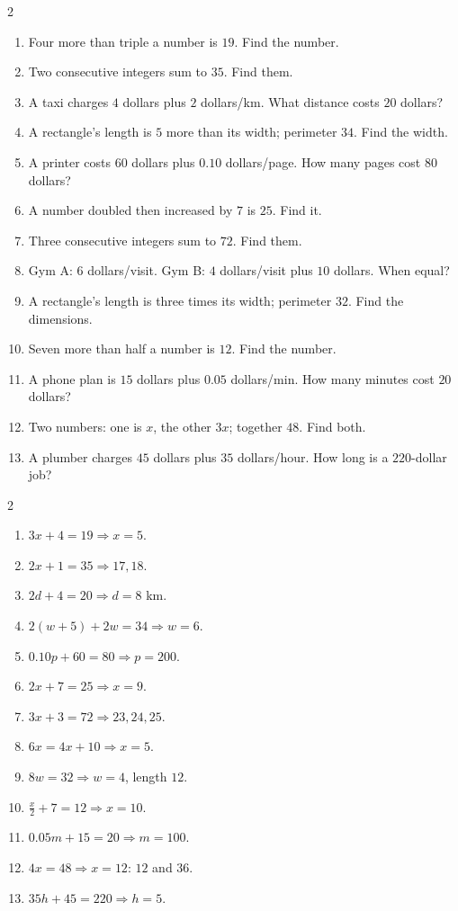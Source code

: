 \documentclass[11pt]{article}
\begin{document}
\begin{recapbox}
\begin{multicols}{2}
\small
\begin{enumerate}[leftmargin=*,itemsep=3pt]
  \item Four more than triple a number is $19$. Find the number.
  \item Two consecutive integers sum to $35$. Find them.
  \item A taxi charges $4$ dollars plus $2$ dollars/km. What distance costs $20$ dollars?
  \item A rectangle's length is $5$ more than its width; perimeter $34$. Find the width.
  \item A printer costs $60$ dollars plus $0.10$ dollars/page. How many pages cost $80$ dollars?
  \item A number doubled then increased by $7$ is $25$. Find it.
  \item Three consecutive integers sum to $72$. Find them.
  \item Gym A: $6$ dollars/visit. Gym B: $4$ dollars/visit plus $10$ dollars. When equal?
  \item A rectangle's length is three times its width; perimeter $32$. Find the dimensions.
  \item Seven more than half a number is $12$. Find the number.
  \item A phone plan is $15$ dollars plus $0.05$ dollars/min. How many minutes cost $20$ dollars?
  \item Two numbers: one is $x$, the other $3x$; together $48$. Find both.
  \item A plumber charges $45$ dollars plus $35$ dollars/hour. How long is a $220$-dollar job?
\end{enumerate}
\end{multicols}
\end{recapbox}

\begin{keybox}
\begin{multicols}{2}
\small
\begin{enumerate}[leftmargin=*,itemsep=3pt]
  \item $3x+4=19\Rightarrow x=5$.
  \item $2x+1=35\Rightarrow 17,18$.
  \item $2d+4=20\Rightarrow d=8$ km.
  \item $2(w+5)+2w=34\Rightarrow w=6$.
  \item $0.10p+60=80\Rightarrow p=200$.
  \item $2x+7=25\Rightarrow x=9$.
  \item $3x+3=72\Rightarrow 23,24,25$.
  \item $6x=4x+10\Rightarrow x=5$.
  \item $8w=32\Rightarrow w=4$, length $12$.
  \item $\tfrac{x}{2}+7=12\Rightarrow x=10$.
  \item $0.05m+15=20\Rightarrow m=100$.
  \item $4x=48\Rightarrow x=12$: $12$ and $36$.
  \item $35h+45=220\Rightarrow h=5$.
\end{enumerate}
\end{multicols}
\end{keybox}
\end{document}

